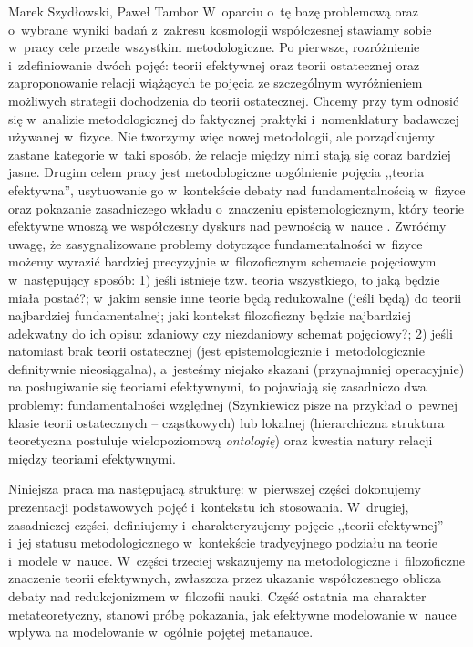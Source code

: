 \begin{artplenv2auth}{Marek Szydłowski, Paweł Tambor}
W~oparciu o~tę bazę problemową oraz o~wybrane wyniki badań z~zakresu kosmologii współczesnej stawiamy sobie w~pracy cele przede wszystkim metodologiczne. Po pierwsze, rozróżnienie i~zdefiniowanie dwóch pojęć: teorii efektywnej oraz teorii ostatecznej oraz zaproponowanie relacji wiążących te pojęcia ze szczególnym wyróżnieniem możliwych strategii dochodzenia do teorii ostatecznej. Chcemy przy tym odnosić się w~analizie metodologicznej do faktycznej praktyki i~nomenklatury badawczej używanej w~fizyce. Nie tworzymy więc nowej metodologii, ale porządkujemy zastane kategorie w~taki sposób, że relacje między nimi stają się coraz bardziej jasne. Drugim celem pracy jest metodologiczne uogólnienie pojęcia ,,teoria efektywna'', usytuowanie go w~kontekście debaty nad fundamentalnością w~fizyce oraz pokazanie zasadniczego wkładu o~znaczeniu epistemologicznym, który teorie efektywne wnoszą we współczesny dyskurs nad pewnością w~nauce
\parencite[][]{szydlowski_model_2008}. %
 Zwróćmy uwagę, że zasygnalizowane problemy dotyczące fundamentalności w~fizyce możemy wyrazić bardziej precyzyjnie w~filozoficznym schemacie pojęciowym w~następujący sposób: 1) jeśli istnieje tzw. teoria wszystkiego, to jaką będzie miała postać?; w~jakim sensie inne teorie będą redukowalne (jeśli będą) do teorii najbardziej fundamentalnej; jaki kontekst filozoficzny będzie najbardziej adekwatny do ich opisu: zdaniowy czy niezdaniowy schemat pojęciowy?; 2) jeśli natomiast brak teorii ostatecznej (jest epistemologicznie i~metodologicznie definitywnie nieosiągalna), a~jesteśmy niejako skazani (przynajmniej operacyjnie) na posługiwanie się teoriami efektywnymi, to pojawiają się zasadniczo dwa problemy: fundamentalności względnej (Szynkiewicz pisze na przykład o~pewnej klasie teorii ostatecznych -- cząstkowych) lub lokalnej (hierarchiczna struktura teoretyczna postuluje wielopoziomową \textit{ontologię}) oraz kwestia natury relacji między teoriami efektywnymi.

Niniejsza praca ma następującą strukturę: w~pierwszej części dokonujemy prezentacji podstawowych pojęć i~kontekstu ich stosowania. W~drugiej, zasadniczej części, definiujemy i~charakteryzujemy pojęcie ,,teorii efektywnej'' i~jej statusu metodologicznego w~kontekście tradycyjnego podziału na teorie i~modele w~nauce. W~części trzeciej wskazujemy na metodologiczne i~filozoficzne znaczenie teorii efektywnych, zwłaszcza przez ukazanie współczesnego oblicza debaty nad redukcjonizmem w~filozofii nauki. Część ostatnia ma charakter metateoretyczny, stanowi próbę pokazania, jak efektywne modelowanie w~nauce wpływa na modelowanie w~ogólnie pojętej metanauce.


\end{artplenv2auth}
